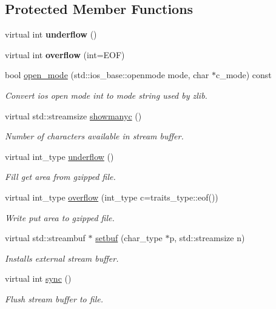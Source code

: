 \subsection*{Protected Member Functions}
\begin{DoxyCompactItemize}
\item 
\hypertarget{classgzfilebuf_a2f7159c91a60bee86546283caf8de212}{virtual int {\bfseries underflow} ()}\label{classgzfilebuf_a2f7159c91a60bee86546283caf8de212}

\item 
\hypertarget{classgzfilebuf_a7a10ee573ebe6777c8a64e316569f694}{virtual int {\bfseries overflow} (int=E\+O\+F)}\label{classgzfilebuf_a7a10ee573ebe6777c8a64e316569f694}

\item 
bool \hyperlink{classgzfilebuf_ac666248032ec539e409d4e0bedd43ec5}{open\+\_\+mode} (std\+::ios\+\_\+base\+::openmode mode, char $\ast$c\+\_\+mode) const 
\begin{DoxyCompactList}\small\item\em Convert ios open mode int to mode string used by zlib. \end{DoxyCompactList}\item 
virtual std\+::streamsize \hyperlink{classgzfilebuf_afbe2418d8a9c3f4a321cc26aa4ae5f7a}{showmanyc} ()
\begin{DoxyCompactList}\small\item\em Number of characters available in stream buffer. \end{DoxyCompactList}\item 
virtual int\+\_\+type \hyperlink{classgzfilebuf_a23768f9935022e54608c53173f0047c0}{underflow} ()
\begin{DoxyCompactList}\small\item\em Fill get area from gzipped file. \end{DoxyCompactList}\item 
virtual int\+\_\+type \hyperlink{classgzfilebuf_a425a4b0d1890abff8f83d7a5aae344b4}{overflow} (int\+\_\+type c=traits\+\_\+type\+::eof())
\begin{DoxyCompactList}\small\item\em Write put area to gzipped file. \end{DoxyCompactList}\item 
virtual std\+::streambuf $\ast$ \hyperlink{classgzfilebuf_a856bc21f7cfc6ba43f017c9c3f0d5f81}{setbuf} (char\+\_\+type $\ast$p, std\+::streamsize n)
\begin{DoxyCompactList}\small\item\em Installs external stream buffer. \end{DoxyCompactList}\item 
virtual int \hyperlink{classgzfilebuf_a8fdf6b079487c0034cb920c63c9eaf55}{sync} ()
\begin{DoxyCompactList}\small\item\em Flush stream buffer to file. \end{DoxyCompactList}\end{DoxyCompactItemize}


